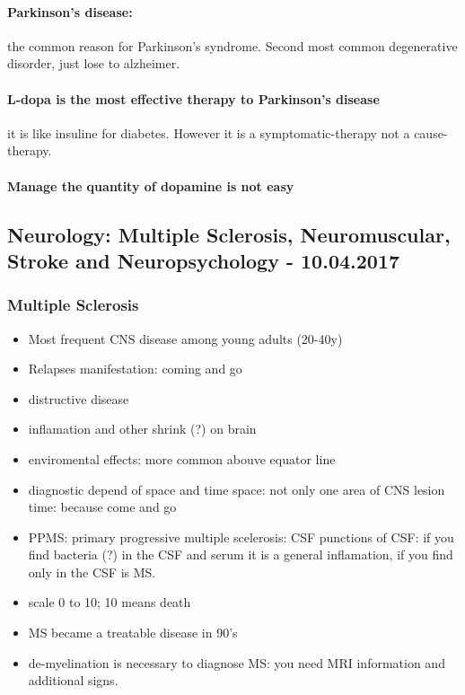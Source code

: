 \documentclass[12pt,article,oneside,a4paper]{memoir}
\begin{document}
\paragraph{Parkinson's disease:} the common reason for Parkinson's syndrome. Second most common degenerative disorder, just lose to alzheimer.

\paragraph{L-dopa is the most effective therapy to Parkinson's disease} it is like insuline for diabetes. However it is a symptomatic-therapy not a cause-therapy.
\paragraph{Manage the quantity of dopamine is not easy}

\subsection{Neurology: Multiple Sclerosis, Neuromuscular, Stroke and Neuropsychology - 10.04.2017}

\subsubsection{Multiple Sclerosis}
\begin{itemize}
\item Most frequent CNS disease among young adults (20-40y)
\item Relapses manifestation: coming and go
\item distructive disease
\item inflamation and other shrink (?) on brain
\item enviromental effects: more common abouve equator line
\item diagnostic depend of space and time
\subitem space: not only one area of CNS lesion
\subitem time: because come and go
\item PPMS: primary progressive multiple scelerosis: CSF
\subitem punctions of CSF: if you find bacteria (?) in the CSF and serum it is a general inflamation, if you find only in the CSF is MS.
\item scale 0 to 10; 10 means death
\item MS became a treatable disease in 90's
\item de-myelination is necessary to diagnose MS: you need MRI information and additional signs.
\end{itemize}
\end{document}
